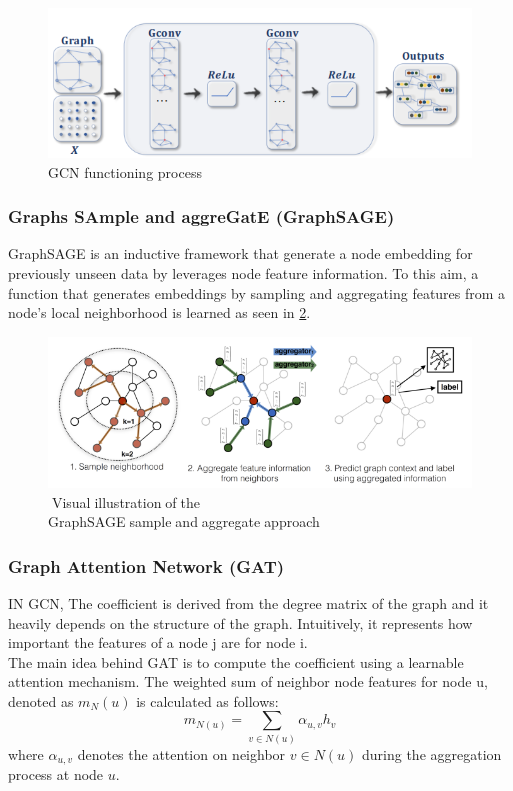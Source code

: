 \begin{figure}
    \centering
    \includegraphics[scale=0.95]{figures/gcn_img.png}
    \captionsetup{font=large}
    \caption{\cite{gnn_review1} GCN functioning process}
    \label{fig:gcn_img}
\end{figure}

\subsubsection{Graphs SAmple and aggreGatE (GraphSAGE) }
\label{GraphSAGE_sec}
GraphSAGE \cite{GraphSAGE} is an inductive framework that generate a node embedding for previously unseen data by leverages node feature information. To this aim, a function that generates embeddings by sampling and aggregating features from a node’s local neighborhood is learned as seen in \ref{fig:graphsage_fig}.

\begin{figure}
    \centering
    \includegraphics[scale=0.75]{figures/graphsage_fig.png}
    \captionsetup{font=large}
    \caption{\textcolor{white}{.}Visual\textcolor{white}{.}illustration\textcolor{white}{.}of\textcolor{white}{.}the GraphSAGE\textcolor{white}{.}sample\textcolor{white}{.}and\textcolor{white}{.}aggregate\textcolor{white}{.}approach}
    \label{fig:graphsage_fig}
\end{figure}

\subsubsection{Graph Attention Network (GAT)}
IN GCN, The coefficient is derived from the degree matrix of the graph and it heavily depends on the structure of the graph. Intuitively, it represents how important the features of a node j are for node i.\\
The main idea behind GAT \cite{gat} is to compute the coefficient using a learnable attention mechanism. The weighted sum of neighbor node features for node u, denoted as $m_N(u)$ is calculated as follows:
\begin{equation}
m_{N(u)} = \sum_{v \in N(u)} \alpha_{u,v}  h_v
\end{equation}
where $\alpha_{u,v}$ denotes the attention on neighbor $v \in N (u)$ during the aggregation process at node $u$. 

